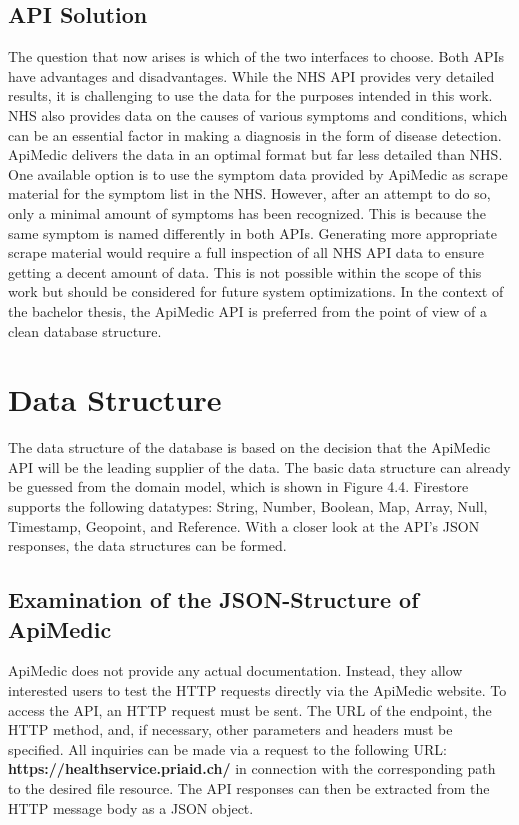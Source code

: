 \subsection{API Solution}
The question that now arises is which of the two interfaces to choose. Both APIs have advantages and disadvantages. While the NHS API provides very detailed results, it is challenging to use the data for the purposes intended in this work. NHS also provides data on the causes of various symptoms and conditions, which can be an essential factor in making a diagnosis in the form of disease detection. ApiMedic delivers the data in an optimal format but far less detailed than NHS. One available option is to use the symptom data provided by ApiMedic as scrape material for the symptom list in the NHS. However, after an attempt to do so, only a minimal amount of symptoms has been recognized. This is because the same symptom is named differently in both APIs. Generating more appropriate scrape material would require a full inspection of all NHS API data to ensure getting a decent amount of data. This is not possible within the scope of this work but should be considered for future system optimizations. In the context of the bachelor thesis, the ApiMedic API is preferred from the point of view of a clean database structure.

\section{Data Structure}
The data structure of the database is based on the decision that the ApiMedic API will be the leading supplier of the data. The basic data structure can already be guessed from the domain model, which is shown in Figure 4.4. Firestore supports the following datatypes: String, Number, Boolean, Map, Array, Null, Timestamp, Geopoint, and Reference. With a closer look at the API's JSON responses, the data structures can be formed.

\subsection{Examination of the JSON-Structure of ApiMedic}
ApiMedic does not provide any actual documentation. Instead, they allow interested users to test the HTTP requests directly via the ApiMedic website. To access the API, an HTTP request must be sent. The URL of the endpoint, the HTTP method, and, if necessary, other parameters and headers must be specified. All inquiries can be made via a request to the following URL: \textbf{https://healthservice.priaid.ch/} in connection with the corresponding path to the desired file resource. The API responses can then be extracted from the HTTP message body as a JSON object.

